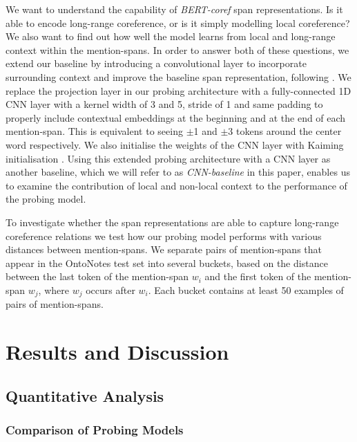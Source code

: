 \documentclass[11pt]{article}
\begin{document}
We want to understand the capability of \textit{BERT-coref} span representations. Is it able to encode long-range coreference, or is it simply modelling local coreference? We also want to find out how well the model learns from local and long-range context within the mention-spans. In order to answer both of these questions, we extend our baseline by introducing a convolutional layer to incorporate surrounding context and improve the baseline span representation, following \textcite{tenney2019context}. We replace the projection layer in our probing architecture with a fully-connected 1D CNN layer with a kernel width of 3 and 5, stride of 1 and same padding to properly include contextual embeddings at the beginning and at the end of each mention-span. This is equivalent to seeing $\pm$1 and $\pm$3 tokens around the center word respectively. We also initialise the weights of the CNN layer with Kaiming initialisation \parencite{kaiming}. Using this extended probing architecture with a CNN layer as another baseline, which we will refer to as \textit{CNN-baseline} in this paper, enables us to examine the contribution of local and non-local context to the performance of the probing model. 

To investigate whether the span representations are able to capture long-range coreference relations we test how our probing model performs with various distances between mention-spans. We separate pairs of mention-spans that appear in the OntoNotes test set into several buckets, based on the distance between the last token of the mention-span $w_{i}$ and the first token of the  mention-span $w_{j}$, where $w_{j}$ occurs after $w_{i}$. Each bucket contains at least 50 examples of pairs of mention-spans. 




\section{Results and Discussion}
\subsection{Quantitative Analysis}
\subsubsection{Comparison of Probing Models}
\end{document}
